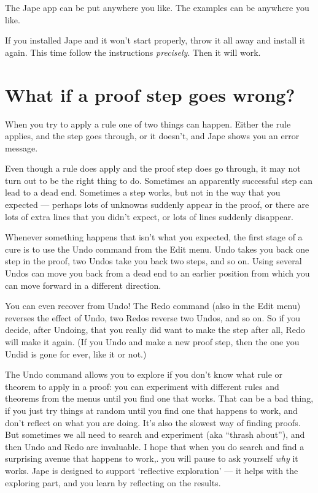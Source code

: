 \documentclass[11pt]{book}
\begin{document}
The Jape app can be put anywhere you like. The examples can be anywhere you like. 

If you installed Jape and it won't start properly, throw it all away and install it again. This time follow the instructions \emph{precisely}. Then it will work.

\section{What if a proof step goes wrong?}

When you try to apply a rule one of two things can happen. Either the rule applies, and the step goes through, or it doesn't, and Jape shows you an error message.

Even though a rule does apply and the proof step does go through, it may not turn out to be the right thing to do. Sometimes an apparently successful step can lead to a dead end. Sometimes a step works, but not in the way that you expected --- perhaps lots of unknowns suddenly appear in the proof, or there are lots of extra lines that you didn't expect, or lots of lines suddenly disappear.

Whenever something happens that isn't what you expected, the first stage of a cure is to use the Undo command from the Edit menu. Undo takes you back one step in the proof, two Undos take you back two steps, and so on. Using several Undos can move you back from a dead end to an earlier position from which you can 
move forward in a different direction.

You can even recover from Undo! The Redo command (also in the Edit menu) reverses the effect of Undo, two Redos reverse two Undos, and so on. So if you decide, after Undoing, that you really did want to make the step after all, Redo will make it again. (If you Undo and make a new proof step, then the one you Undid is 
gone for ever, like it or not.)

The Undo command allows you to explore if you don't know what rule or theorem to apply in a proof: you can experiment with different rules and theorems from the menus until you find one that works. That can be a bad thing, if you just try things at random until you find one that happens to work, and don't reflect on what you are doing. It's also the slowest way of finding proofs. But sometimes we all need to search and experiment (aka ``thrash about''), and then Undo and Redo are invaluable. I hope that when you do search and find a surprising avenue that happens to work,. you will pause to ask yourself \emph{why} it works. Jape is designed to support `reflective exploration' --- it helps with the exploring part, and you learn by reflecting on the results.
\end{document}
